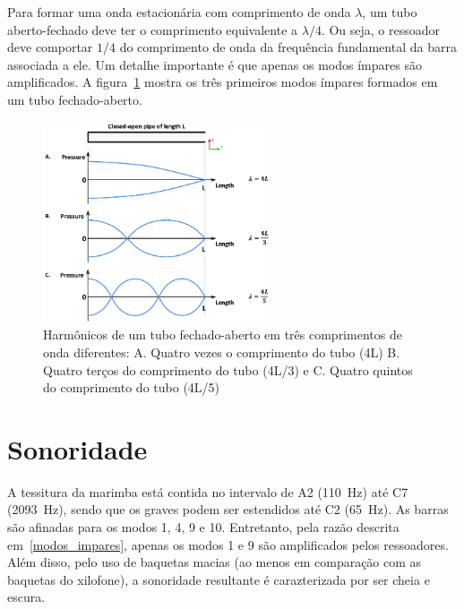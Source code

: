 \documentclass{article}
\begin{document}
Para formar uma onda estacionária com comprimento de onda $\lambda$, um tubo aberto-fechado deve ter o comprimento equivalente a $\lambda / 4$. Ou seja, o ressoador deve comportar $1/4$ do comprimento de onda da frequência fundamental da barra associada a ele. {Um detalhe importante é que apenas os modos ímpares são amplificados}\label{modos_impares}. A figura~\ref{fig:closed_open_pipe} mostra os três primeiros modos ímpares formados em um tubo fechado-aberto.  \begin{figure}[H] \centering \includegraphics[width=0.6\textwidth]{Harmonics-of-a-closed-open-pipe-in-three-different-wavelengths-A-Four-times-the-length.png} \caption{Harmônicos de um tubo fechado-aberto em três comprimentos de onda diferentes: A. Quatro vezes o comprimento do tubo (4L) B. Quatro terços do comprimento do tubo (4L/3) e C. Quatro quintos do comprimento do tubo (4L/5)~\cite{closed_open_pipe}}
	\label{fig:closed_open_pipe}
\end{figure}

\section{Sonoridade}

A tessitura da marimba está contida no intervalo de A2 (\SI{110}{\hertz}) até C7 (\SI{2093}{\hertz}), sendo que os graves podem ser estendidos até C2 (\SI{65}{\hertz}).
As barras são afinadas para os modos 1, 4, 9 e 10. Entretanto, pela razão descrita em~\ref{modos_impares}, apenas os modos 1 e 9 são amplificados pelos ressoadores. Além disso, pelo uso de baquetas macias (ao menos em comparação com as baquetas do xilofone), a sonoridade resultante é carazterizada por ser cheia e escura.



\end{document}
